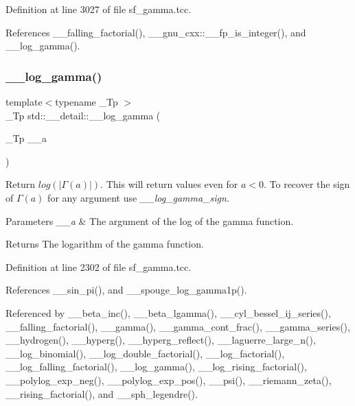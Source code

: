 Definition at line 3027 of file sf\+\_\+gamma.\+tcc.



References \+\_\+\+\_\+falling\+\_\+factorial(), \+\_\+\+\_\+gnu\+\_\+cxx\+::\+\_\+\+\_\+fp\+\_\+is\+\_\+integer(), and \+\_\+\+\_\+log\+\_\+gamma().

\mbox{\label{namespacestd_1_1____detail_af6c4c0192a07f467fd9ddeebb28a34d4}} 
\subsubsection{\texorpdfstring{\+\_\+\+\_\+log\+\_\+gamma()}{\_\_log\_gamma()}\hspace{0.1cm}{\footnotesize\ttfamily [1/2]}}
{\footnotesize\ttfamily template$<$typename \+\_\+\+Tp $>$ \\
\+\_\+\+Tp std\+::\+\_\+\+\_\+detail\+::\+\_\+\+\_\+log\+\_\+gamma (\begin{DoxyParamCaption}\item[{\+\_\+\+Tp}]{\+\_\+\+\_\+a }\end{DoxyParamCaption})}



Return $ log(|\Gamma(a)|) $. This will return values even for $ a < 0 $. To recover the sign of $ \Gamma(a) $ for any argument use {\itshape \+\_\+\+\_\+log\+\_\+gamma\+\_\+sign}. 


\begin{DoxyParams}{Parameters}
{\em \+\_\+\+\_\+a} & The argument of the log of the gamma function. \\
\hline
\end{DoxyParams}
\begin{DoxyReturn}{Returns}
The logarithm of the gamma function. 
\end{DoxyReturn}


Definition at line 2302 of file sf\+\_\+gamma.\+tcc.



References \+\_\+\+\_\+sin\+\_\+pi(), and \+\_\+\+\_\+spouge\+\_\+log\+\_\+gamma1p().



Referenced by \+\_\+\+\_\+beta\+\_\+inc(), \+\_\+\+\_\+beta\+\_\+lgamma(), \+\_\+\+\_\+cyl\+\_\+bessel\+\_\+ij\+\_\+series(), \+\_\+\+\_\+falling\+\_\+factorial(), \+\_\+\+\_\+gamma(), \+\_\+\+\_\+gamma\+\_\+cont\+\_\+frac(), \+\_\+\+\_\+gamma\+\_\+series(), \+\_\+\+\_\+hydrogen(), \+\_\+\+\_\+hyperg(), \+\_\+\+\_\+hyperg\+\_\+reflect(), \+\_\+\+\_\+laguerre\+\_\+large\+\_\+n(), \+\_\+\+\_\+log\+\_\+binomial(), \+\_\+\+\_\+log\+\_\+double\+\_\+factorial(), \+\_\+\+\_\+log\+\_\+factorial(), \+\_\+\+\_\+log\+\_\+falling\+\_\+factorial(), \+\_\+\+\_\+log\+\_\+gamma(), \+\_\+\+\_\+log\+\_\+rising\+\_\+factorial(), \+\_\+\+\_\+polylog\+\_\+exp\+\_\+neg(), \+\_\+\+\_\+polylog\+\_\+exp\+\_\+pos(), \+\_\+\+\_\+psi(), \+\_\+\+\_\+riemann\+\_\+zeta(), \+\_\+\+\_\+rising\+\_\+factorial(), and \+\_\+\+\_\+sph\+\_\+legendre().

